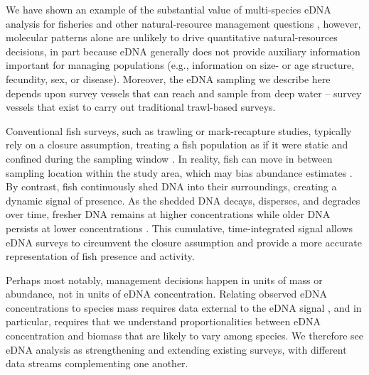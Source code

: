 \documentclass[9pt,twocolumn,twoside]{pnas-new}
\begin{document}
We have shown an example of the substantial value of multi-species eDNA analysis for fisheries and other natural-resource management questions \cite{ledger2024,stoeckle2024}, however, molecular patterns alone are unlikely to drive quantitative natural-resources decisions, in part because eDNA generally does not provide auxiliary information important for managing populations (e.g., information on size- or age structure, fecundity, sex, or disease). Moreover, the eDNA sampling we describe here depends upon survey vessels that can reach and sample from deep water – survey vessels that exist to carry out traditional trawl-based surveys. 

Conventional fish surveys, such as trawling or mark-recapture studies, typically rely on a closure assumption, treating a fish population as if it were static and confined during the sampling window \cite{bailey2014}. In reality, fish can move in between sampling location within the study area, which may bias abundance estimates  \cite{rota2009}. By contrast, fish continuously shed DNA into their surroundings, creating a dynamic signal of presence. As the shedded DNA decays, disperses, and degrades over time, fresher DNA remains at higher concentrations while older DNA persists at lower concentrations \cite{thomsen2015,jerde2011}. This cumulative, time-integrated signal allows eDNA surveys to circumvent the closure assumption and provide a more accurate representation of fish presence and activity.

Perhaps most notably, management decisions happen in units of mass or abundance, not in units of eDNA concentration. Relating observed eDNA concentrations to species mass requires data external to the eDNA signal \cite{guri2024a}, and in particular, requires that we understand proportionalities between eDNA concentration and biomass that are likely to vary among species. We therefore see eDNA analysis as strengthening and extending existing surveys, with different data streams complementing one another. 
\end{document}
